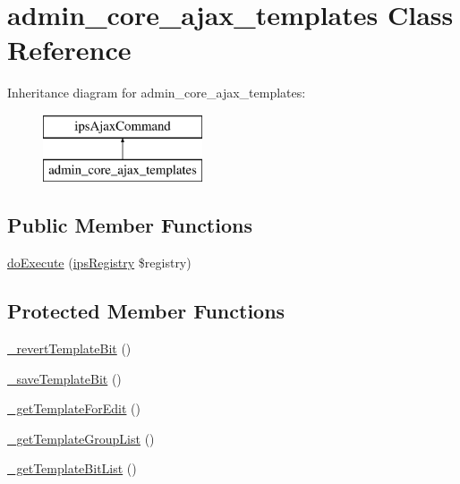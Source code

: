 \hypertarget{classadmin__core__ajax__templates}{\section{admin\-\_\-core\-\_\-ajax\-\_\-templates Class Reference}
\label{classadmin__core__ajax__templates}
}
Inheritance diagram for admin\-\_\-core\-\_\-ajax\-\_\-templates\-:\begin{figure}[H]
\begin{center}
\leavevmode
\includegraphics[height=2.000000cm]{classadmin__core__ajax__templates}
\end{center}
\end{figure}
\subsection*{Public Member Functions}
\begin{DoxyCompactItemize}
\item 
\hyperlink{classadmin__core__ajax__templates_afbc4e912a0604b94d47d66744c64d8ba}{do\-Execute} (\hyperlink{classips_registry}{ips\-Registry} \$registry)
\end{DoxyCompactItemize}
\subsection*{Protected Member Functions}
\begin{DoxyCompactItemize}
\item 
\hyperlink{classadmin__core__ajax__templates_a6c3be7aa3c5788901ca3d01c755c9db1}{\-\_\-revert\-Template\-Bit} ()
\item 
\hyperlink{classadmin__core__ajax__templates_a82ef3a1d5e0e6b94cdb4ab9d98673467}{\-\_\-save\-Template\-Bit} ()
\item 
\hyperlink{classadmin__core__ajax__templates_acabf4a60f35fcd6933daf6352da30e1a}{\-\_\-get\-Template\-For\-Edit} ()
\item 
\hyperlink{classadmin__core__ajax__templates_a4bab55d9f67782141e973fc93cd50cbe}{\-\_\-get\-Template\-Group\-List} ()
\item 
\hyperlink{classadmin__core__ajax__templates_a17f5e6f1686896d9fa45a9ee7617d1cf}{\-\_\-get\-Template\-Bit\-List} ()
\end{DoxyCompactItemize}
